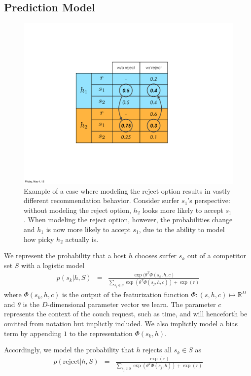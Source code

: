 

\subsection{Prediction Model}
\begin{figure}[ht]
\centering
\includegraphics[width=0.6\linewidth]{figures/reject_vs_no_reject.pdf}
\caption{
Example of a case where modeling the reject option results in vastly different recommendation behavior.
Consider surfer $s_1$'s perspective: without modeling the reject option, $h_2$ looks more likely to accept $s_1$.
When modeling the reject option, however, the probabilities change and $h_1$ is now more likely to accept $s_1$, due to the ability to model how picky $h_2$ actually is.}
\label{fig:reject_vs_no_reject}
\end{figure}

We represent the probability that a host $h$ chooses surfer $s_k$ out of a competitor set $S$ with a logistic model
\begin{eqnarray}
p(s_k | h, S) &=& \frac{\exp(\theta^T \Phi(s_k,h,c)}{\sum_{s_j \in S} \exp(\theta^T \Phi(s_j,h,c)) + \exp(r)}
\end{eqnarray}
where $\Phi(s_k,h,c)$ is the output of the featurization function $\Phi: (s,h,c)  \mapsto \mathbb{R}^D$ and $\theta$ is the $D$-dimensional parameter vector we learn.
The parameter $c$ represents the context of the couch request, such as time, and will henceforth be omitted from notation but implictly included.
We also implictly model a bias term by appending $1$ to the representation $\Phi(s_k,h)$.

Accordingly, we model the probability that $h$ rejects all $s_k \in S$ as
\begin{eqnarray}
p(\text{reject} | h, S) &=& \frac{\exp(r)}{\sum_{s_j \in S} \exp(\theta^T \Phi(s_j,h)) + \exp(r)}
\end{eqnarray}

